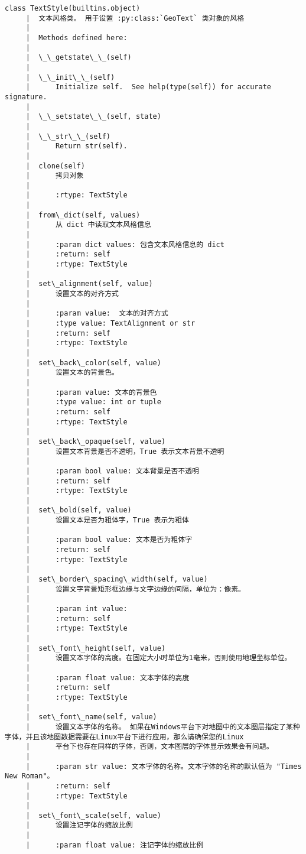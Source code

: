 \documentclass[11pt]{article}
\begin{document}
\begin{Verbatim}[commandchars=\\\{\}]
    class TextStyle(builtins.object)
     |  文本风格类。 用于设置 :py:class:`GeoText` 类对象的风格
     |  
     |  Methods defined here:
     |  
     |  \_\_getstate\_\_(self)
     |  
     |  \_\_init\_\_(self)
     |      Initialize self.  See help(type(self)) for accurate signature.
     |  
     |  \_\_setstate\_\_(self, state)
     |  
     |  \_\_str\_\_(self)
     |      Return str(self).
     |  
     |  clone(self)
     |      拷贝对象
     |      
     |      :rtype: TextStyle
     |  
     |  from\_dict(self, values)
     |      从 dict 中读取文本风格信息
     |      
     |      :param dict values: 包含文本风格信息的 dict
     |      :return: self
     |      :rtype: TextStyle
     |  
     |  set\_alignment(self, value)
     |      设置文本的对齐方式
     |      
     |      :param value:  文本的对齐方式
     |      :type value: TextAlignment or str
     |      :return: self
     |      :rtype: TextStyle
     |  
     |  set\_back\_color(self, value)
     |      设置文本的背景色。
     |      
     |      :param value: 文本的背景色
     |      :type value: int or tuple
     |      :return: self
     |      :rtype: TextStyle
     |  
     |  set\_back\_opaque(self, value)
     |      设置文本背景是否不透明，True 表示文本背景不透明
     |      
     |      :param bool value: 文本背景是否不透明
     |      :return: self
     |      :rtype: TextStyle
     |  
     |  set\_bold(self, value)
     |      设置文本是否为粗体字，True 表示为粗体
     |      
     |      :param bool value: 文本是否为粗体字
     |      :return: self
     |      :rtype: TextStyle
     |  
     |  set\_border\_spacing\_width(self, value)
     |      设置文字背景矩形框边缘与文字边缘的间隔，单位为：像素。
     |      
     |      :param int value:
     |      :return: self
     |      :rtype: TextStyle
     |  
     |  set\_font\_height(self, value)
     |      设置文本字体的高度。在固定大小时单位为1毫米，否则使用地理坐标单位。
     |      
     |      :param float value: 文本字体的高度
     |      :return: self
     |      :rtype: TextStyle
     |  
     |  set\_font\_name(self, value)
     |      设置文本字体的名称。 如果在Windows平台下对地图中的文本图层指定了某种字体，并且该地图数据需要在Linux平台下进行应用，那么请确保您的Linux
     |      平台下也存在同样的字体，否则，文本图层的字体显示效果会有问题。
     |      
     |      :param str value: 文本字体的名称。文本字体的名称的默认值为 "Times New Roman"。
     |      :return: self
     |      :rtype: TextStyle
     |  
     |  set\_font\_scale(self, value)
     |      设置注记字体的缩放比例
     |      
     |      :param float value: 注记字体的缩放比例

\end{Verbatim}
\end{document}
